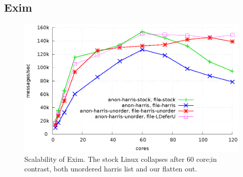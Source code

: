 \subsection{Exim}
\begin{figure}[tb]
  \begin{center}
    \includegraphics[scale=0.65]{graph/exim.eps}
  \end{center}
  \caption{Scalability of Exim. The stock Linux collapses after 60 core;in
  contrast, both unordered harris list and our  flatten out.}
  \label{fig:exim}
\end{figure}

